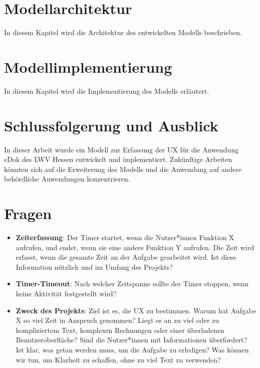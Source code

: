 \documentclass[a4paper,12pt]{report}
\begin{document}
\chapter{Modellarchitektur}
In diesem Kapitel wird die Architektur des entwickelten Modells beschrieben.

\chapter{Modellimplementierung}
In diesem Kapitel wird die Implementierung des Modells erläutert.

\chapter{Schlussfolgerung und Ausblick}
In dieser Arbeit wurde ein Modell zur Erfassung der UX für die Anwendung eDok des LWV Hessen entwickelt und implementiert. Zukünftige Arbeiten könnten sich auf die Erweiterung des Modells und die Anwendung auf andere behördliche Anwendungen konzentrieren.
\chapter{Fragen}
\begin{itemize}
    \item \textbf{Zeiterfassung}: Der Timer startet, wenn die Nutzer*innen Funktion X aufrufen, und endet, wenn sie eine andere Funktion Y aufrufen. Die Zeit wird erfasst, wenn die gesamte Zeit an der Aufgabe gearbeitet wird. Ist diese Information nützlich und im Umfang des Projekts?
    \item \textbf{Timer-Timeout}: Nach welcher Zeitspanne sollte der Timer stoppen, wenn keine Aktivität festgestellt wird?
    \item \textbf{Zweck des Projekts}: Ziel ist es, die UX zu bestimmen. Warum hat Aufgabe X so viel Zeit in Anspruch genommen? Liegt es an zu viel oder zu kompliziertem Text, komplexen Rechnungen oder einer überladenen Benutzeroberfläche? Sind die Nutzer*innen mit Informationen überfordert? Ist klar, was getan werden muss, um die Aufgabe zu erledigen? Was können wir tun, um Klarheit zu schaffen, ohne zu viel Text zu verwenden?
\end{itemize}
\end{document}
